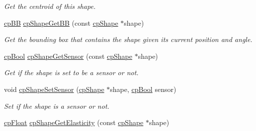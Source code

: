 \begin{DoxyCompactItemize}
\begin{DoxyCompactList}\small\item\em Get the centroid of this shape. \end{DoxyCompactList}\item 
\hypertarget{group__cp_shape_ga569699447fe658a3751a0c9f28347abf}{}\hyperlink{structcp_b_b}{cp\+B\+B} \hyperlink{group__cp_shape_ga569699447fe658a3751a0c9f28347abf}{cp\+Shape\+Get\+B\+B} (const \hyperlink{structcp_shape}{cp\+Shape} $\ast$shape)\label{group__cp_shape_ga569699447fe658a3751a0c9f28347abf}

\begin{DoxyCompactList}\small\item\em Get the bounding box that contains the shape given it\textquotesingle{}s current position and angle. \end{DoxyCompactList}\item 
\hypertarget{group__cp_shape_ga2e235a7ecc0fac5e74a75df2e6a14d24}{}\hyperlink{group__basic_types_gabc5e752c48f3449ca26ef413ecbd647e}{cp\+Bool} \hyperlink{group__cp_shape_ga2e235a7ecc0fac5e74a75df2e6a14d24}{cp\+Shape\+Get\+Sensor} (const \hyperlink{structcp_shape}{cp\+Shape} $\ast$shape)\label{group__cp_shape_ga2e235a7ecc0fac5e74a75df2e6a14d24}

\begin{DoxyCompactList}\small\item\em Get if the shape is set to be a sensor or not. \end{DoxyCompactList}\item 
\hypertarget{group__cp_shape_gae0a16abf7c060a31c53775a2396c294f}{}void \hyperlink{group__cp_shape_gae0a16abf7c060a31c53775a2396c294f}{cp\+Shape\+Set\+Sensor} (\hyperlink{structcp_shape}{cp\+Shape} $\ast$shape, \hyperlink{group__basic_types_gabc5e752c48f3449ca26ef413ecbd647e}{cp\+Bool} sensor)\label{group__cp_shape_gae0a16abf7c060a31c53775a2396c294f}

\begin{DoxyCompactList}\small\item\em Set if the shape is a sensor or not. \end{DoxyCompactList}\item 
\hypertarget{group__cp_shape_ga76ed22ee6920c51ed7fab1411af1aa51}{}\hyperlink{group__basic_types_gac1ed65573e035bf892505768c852d8d3}{cp\+Float} \hyperlink{group__cp_shape_ga76ed22ee6920c51ed7fab1411af1aa51}{cp\+Shape\+Get\+Elasticity} (const \hyperlink{structcp_shape}{cp\+Shape} $\ast$shape)\label{group__cp_shape_ga76ed22ee6920c51ed7fab1411af1aa51}


\end{DoxyCompactItemize}
